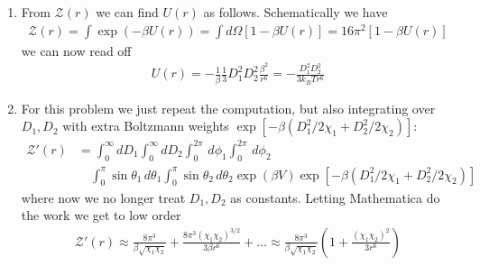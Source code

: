 \documentclass{article}
\theoremstyle{definition}
\newcommand{\be}{\beta}
\newcommand{\f}[2]{\frac{#1}{#2}}
\newcommand{\lp}{\left(}
\newcommand{\rp}{\right)}
\begin{document}
\begin{enumerate}[label=(\alph*)]
\begin{lstlisting}
	(*First order*)
	In[33]:= (*First order*)
	
	In[34]:= Integrate[Sin[\[Theta]1]*Sin[\[Theta]2]*\[Beta] (D1*D2)/(R^3)*(2*Cos[\[Theta]1]*
	Cos[\[Theta]2] - 
	Sin[\[Theta]1]*Sin[\[Theta]2]*
	Cos[\[Phi]1 - \[Phi]2] ), {\[Theta]1, 0, Pi}, {\[Theta]2, 0, 
	Pi}, {\[Phi]1, 0, 2 Pi}, {\[Phi]2, 0, 2 Pi}]
	
	Out[34]= 0
	
	(*Second order*)
	In[32]:= (*Second order*)
	
	In[25]:= Integrate[Sin[\[Theta]1]*Sin[\[Theta]2]*(\[Beta]^2/
	2)*(D1*D2)^2/(R^6)*(2*Cos[\[Theta]1]*Cos[\[Theta]2] - 
	Sin[\[Theta]1]*Sin[\[Theta]2]*
	Cos[\[Phi]1 - \[Phi]2] )^2, {\[Theta]1, 0, Pi}, {\[Theta]2, 0, 
	Pi}, {\[Phi]1, 0, 2 Pi}, {\[Phi]2, 0, 2 Pi}]
	
	Out[25]= (9 D1^2 D2^2 \[Pi]^4 \[Beta]^2)/(4 R^6)
	\end{lstlisting}
	
	\item From $\mathcal{Z}(r)$ we can find $U(r)$ as follows. Schematically we have
	\begin{align*}
	\mathcal{Z}(r) = \int \exp(-\be U(r)) = \int d\Omega [1-\be U(r)] = 16\pi^2 [1-\be U(r)]
	\end{align*}
	we can now read off 
	\begin{align*}
	U(r) = -\f{1}{\be} \f{1}{3} D_1^2 D_2^2 \f{\be^2}{r^6} = \boxed{ -\f{D_1^2 D_2^2 }{3k_BT r^6 }} 
	\end{align*}
	
	\item For this problem we just repeat the computation, but also integrating over $D_1, D_2$ with extra Boltzmann weights $\exp[-\be(D_1^2/2\chi_1 + D_2^2/2\chi_2)]$: 
	\begin{align*}
	\mathcal{Z}'(r) &= \int_0^\infty d D_1\int_0^\infty dD_2\int_0^{2\pi}\,d\phi_1 \int_0^{2\pi}\,d\phi_2 \\
	&\quad\int_0^\pi \sin\theta_1 \, d\theta_1 \int_0^\pi \sin\theta_2\, d\theta_2 \exp(\be V) \exp[-\be(D_1^2/2\chi_1 + D_2^2/2\chi_2)]
	\end{align*}
	where now we no longer treat $D_1,D_2$ as constants. Letting Mathematica do the work we get to low order
	\begin{align*}
	\mathcal{Z}'(r) \approx \f{8\pi^3}{\be \sqrt{\chi_1\chi_2}} + \f{8\pi^3 (\chi_1\chi_2)^{3/2}}{3\be r^6} + \dots \approx  \f{8\pi^3}{\be \sqrt{\chi_1 \chi_2}}\lp 1 + \f{(\chi_1\chi_2)^2}{3r^6} \rp
	\end{align*}
	

\end{enumerate}
\end{document}
